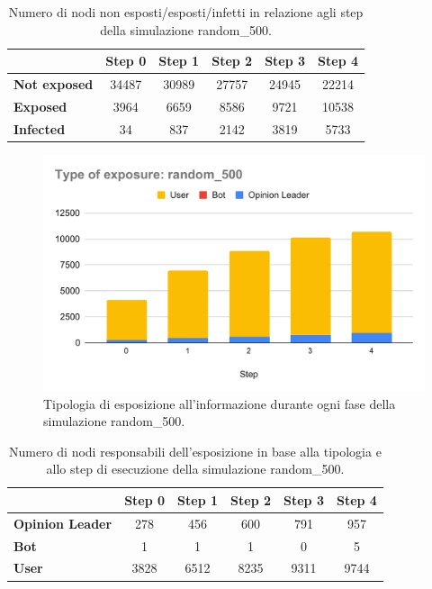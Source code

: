             \begin{table}[H]
                \centering
                \begin{tabular}{l|c|c|c|c|c}
                            & Step 0 & Step 1 & Step 2 & Step 3 & Step 4 \\ \hline
                \textbf{Not exposed} & 34487  & 30989  & 27757  & 24945  & 22214  \\ \hline
                \textbf{Exposed}     & 3964   & 6659   & 8586   & 9721   & 10538  \\ \hline
                \textbf{Infected}    & 34     & 837    & 2142   & 3819   & 5733   \\
                \end{tabular}
                \caption{Numero di nodi non esposti/esposti/infetti in relazione agli step della simulazione random\_500.}
            \end{table}
            
        \begin{figure}[H]
            \centering
            \includegraphics[width=.7\textwidth]{resources/charts/Type of exposure_ random_500.pdf}
            \caption{Tipologia di esposizione all'informazione durante ogni fase della simulazione random\_500.}
        \end{figure}
        
        \begin{table}[H]
            \centering
            \begin{tabular}{l|c|c|c|c|c}
                           & Step 0 & Step 1 & Step 2 & Step 3 & Step 4 \\ \hline
            \textbf{Opinion Leader} & 278    & 456    & 600    & 791    & 957    \\ \hline
            \textbf{Bot}            & 1      & 1      & 1      & 0      & 5      \\ \hline
            \textbf{User}           & 3828   & 6512   & 8235   & 9311   & 9744   \\
            \end{tabular}
            \caption{Numero di nodi responsabili dell'esposizione in base alla tipologia e allo step di esecuzione della simulazione random\_500.}
        \end{table}


